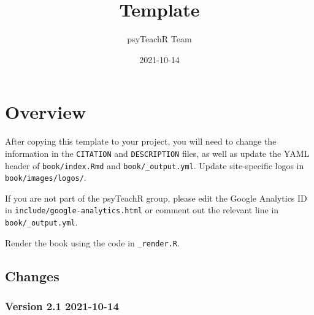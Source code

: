 \documentclass[
  oneside]{book}
\title{Template}
\author{psyTeachR Team}
\date{2021-10-14}
\begin{document}
\maketitle

{
\setcounter{tocdepth}{1}
\tableofcontents
}
\hypertarget{overview}{%
\chapter*{Overview}\label{overview}}

After copying this template to your project, you will need to change the information in the \texttt{CITATION} and \texttt{DESCRIPTION} files, as well as update the YAML header of \texttt{book/index.Rmd} and \texttt{book/\_output.yml}. Update site-specific logos in \texttt{book/images/logos/}.

If you are not part of the psyTeachR group, please edit the Google Analytics ID in \texttt{include/google-analytics.html} or comment out the relevant line in \texttt{book/\_output.yml}.

Render the book using the code in \texttt{\_render.R}.

\hypertarget{changes}{%
\section{Changes}\label{changes}}

\hypertarget{version-2.1-2021-10-14}{%
\subsection{Version 2.1 2021-10-14}\label{version-2.1-2021-10-14}}
\end{document}
